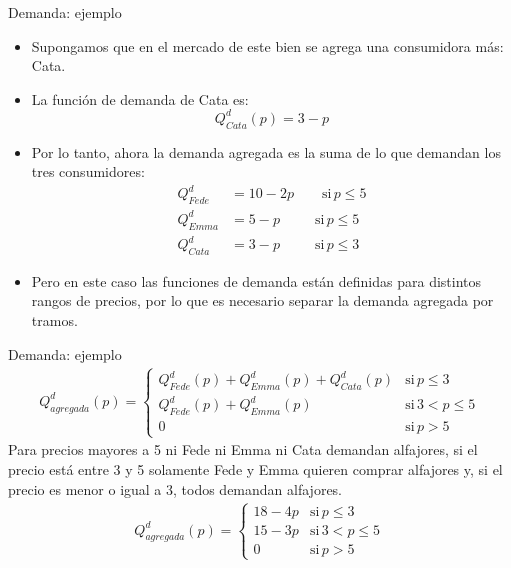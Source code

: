 \documentclass{beamer}
\begin{document}
\begin{frame}{Demanda: ejemplo}
    \begin{itemize}
        \item Supongamos que en el mercado de este bien se agrega una consumidora más: Cata. 
        \item La función de demanda de Cata es: 
        \[Q_{Cata}^{d}(p) = 3 - p\]
        \item Por lo tanto, ahora la demanda agregada es la suma de lo que demandan los tres consumidores: 
\begin{align*}
    Q^{d}_{Fede} &= 10-2p \quad \quad \text{si} \, p\leq 5\\
    Q^{d}_{Emma} &= 5-p \quad \quad \,\,\, \text{si}\, p\leq 5\\
    Q^{d}_{Cata} &= 3-p \quad \quad \,\,\, \text{si} \, p\leq 3
\end{align*}
        \item Pero en este caso las funciones de demanda están definidas
        para distintos rangos de precios, por lo que es necesario
        separar la demanda agregada por tramos.
    \end{itemize}
\end{frame}

\begin{frame}{Demanda: ejemplo}
\begin{align*}
    Q_{agregada}^{d}(p) = \begin{cases}
    Q_{Fede}^{d}(p) + Q_{Emma}^{d}(p)+Q_{Cata}^{d}(p) & \text{si} \, p\leq 3\\
    Q_{Fede}^{d}(p) + Q_{Emma}^{d}(p) & \text{si} \, 3<p\leq 5\\
    0 & \text{si} \, p> 5
    \end{cases}
\end{align*}
Para precios mayores a 5 ni Fede ni Emma ni Cata demandan
alfajores, si el precio está entre 3 y 5 solamente Fede y Emma
quieren comprar alfajores y, si el precio es menor o igual a 3, todos
demandan alfajores.
\begin{align*}
    Q_{agregada}^{d}(p) = \begin{cases}
   18-4p & \text{si} \, p\leq 3\\
    15-3p & \text{si} \, 3<p\leq 5\\
    0 & \text{si} \, p> 5
    \end{cases}
\end{align*}
\end{frame}
\end{document}

